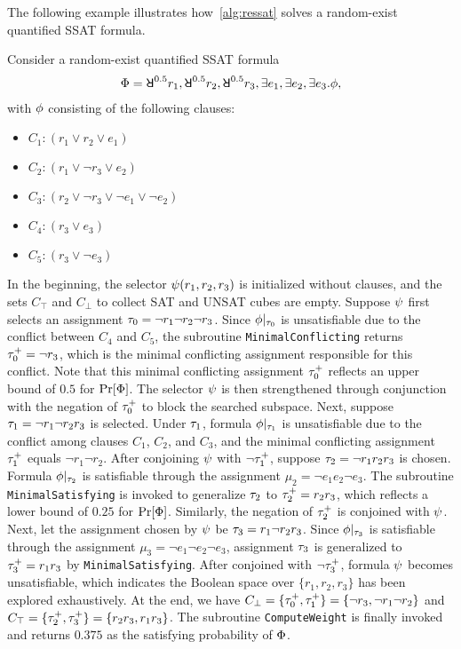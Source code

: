 The following example illustrates how~\cref{alg:ressat} solves a random-exist quantified SSAT formula.
\begin{example}
    Consider a random-exist quantified SSAT formula
    \begin{align*}
        \Qf=\random{0.5}r_1,\random{0.5}r_2,\random{0.5}r_3,\exists e_1,\exists e_2,\exists e_3.\pf,
    \end{align*}
    with $\phi$ consisting of the following clauses:
    \begin{itemize}
        \item[] $C_1: (r_1 \lor r_2 \lor e_1)$
        \item[] $C_2: (r_1 \lor \lnot r_3 \lor e_2)$
        \item[] $C_3: (r_2 \lor \lnot r_3 \lor \lnot e_1 \lor \lnot e_2)$
        \item[] $C_4: (r_3 \lor e_3)$
        \item[] $C_5: (r_3 \lor \lnot e_3)$
    \end{itemize}
    In the beginning, the selector $\psi(r_1,r_2,r_3)$ is initialized without clauses,
    and the sets $C_\top$ and $C_\bot$ to collect SAT and UNSAT cubes are empty.
    Suppose $\psi$ first selects an assignment $\tau_0=\lnot r_1 \lnot r_2 \lnot r_3$.
    Since $\phi|_{\tau_0}$ is unsatisfiable due to the conflict between $C_4$ and $C_5$,
    the subroutine \texttt{MinimalConflicting} returns $\tau_0^+=\lnot r_3$,
    which is the minimal conflicting assignment responsible for this conflict.
    Note that this minimal conflicting assignment $\tau_0^+$ reflects an upper bound of $0.5$ for $\Pr[\Phi]$.
    The selector $\psi$ is then strengthened through conjunction with the negation of $\tau_0^+$ to block the searched subspace.
    Next, suppose $\tau_1=\lnot r_1 \lnot r_2 r_3$ is selected.
    Under $\tau_1$,
    formula $\phi|_{\tau_1}$ is unsatisfiable due to the conflict among clauses $C_1$, $C_2$, and $C_3$,
    and the minimal conflicting assignment $\tau_1^+$ equals $\lnot r_1 \lnot r_2$.
    After conjoining $\psi$ with $\lnot \tau_1^+$, suppose $\tau_2=\lnot r_1 r_2 r_3$ is chosen.
    Formula $\phi|_{\tau_2}$ is satisfiable through the assignment $\mu_2=\lnot e_1 e_2 \lnot e_3$.
    The subroutine \texttt{MinimalSatisfying} is invoked to generalize $\tau_2$ to $\tau_2^+=r_2r_3$,
    which reflects a lower bound of $0.25$ for $\Pr[\Phi]$.
    Similarly, the negation of $\tau_2^+$ is conjoined with $\psi$.
    Next, let the assignment chosen by $\psi$ be $\tau_3=r_1 \lnot r_2 r_3$.
    Since $\phi|_{\tau_3}$ is satisfiable through the assignment $\mu_3=\lnot e_1 \lnot e_2 \lnot e_3$,
    assignment $\tau_3$ is generalized to $\tau_3^+=r_1r_3$ by \texttt{MinimalSatisfying}.
    After conjoined with $\lnot \tau_3^+$,
    formula $\psi$ becomes unsatisfiable,
    which indicates the Boolean space over $\{r_1,r_2,r_3\}$ has been explored exhaustively.
    At the end, we have
    $C_\bot=\{\tau_0^+,\tau_1^+\}=\{\lnot r_3,\lnot r_1 \lnot r_2\}$ and
    $C_\top=\{\tau_2^+,\tau_3^+\}=\{r_2r_3,r_1r_3\}$.
    The subroutine \texttt{ComputeWeight} is finally invoked and returns $0.375$ as the satisfying probability of $\Phi$.


\end{example}

